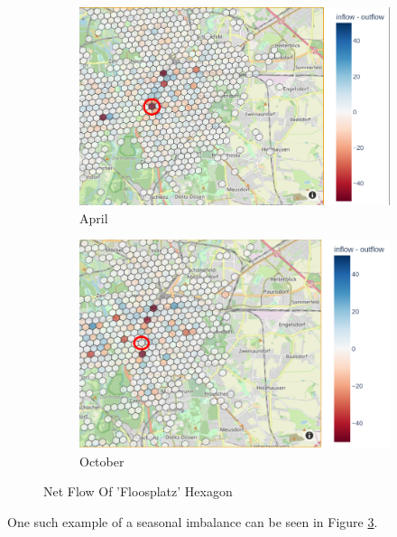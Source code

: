 \begin{figure}[htb]
    \centering
    \begin{subfigure}[b]{0.45\textwidth}
        \includegraphics[width=1\textwidth]{Figures/descriptive_analysis/flossplatz_april.png}
        \caption{April}
        \label{fig:descriptive_analysis_flossplatz_april}
    \end{subfigure}
    \begin{subfigure}[b]{0.45\textwidth}
        \includegraphics[width=1\textwidth]{Figures/descriptive_analysis/flossplatz_october.png}
        \caption{October}
        \label{fig:descriptive_analysis_flossplatz_october}
    \end{subfigure}
    \caption{Net Flow Of 'Floosplatz' Hexagon}
    \label{fig:descriptive_analysis_flossplatz}
\end{figure}

One such example of a seasonal imbalance can be seen in Figure \ref{fig:descriptive_analysis_flossplatz}.


